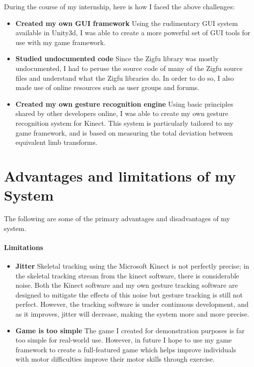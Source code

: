 \documentclass{report}
\begin{document}
During the course of my internship, here is how I faced the above challenges:

\begin{itemize}
	\item \textbf{Created my own GUI framework} Using the rudimentary GUI system available in Unity3d, I was able to create a more powerful set of GUI tools for use with my game framework. 

	\item \textbf{Studied undocumented code} Since the Zigfu library was mostly undocumented, I had to peruse the source code of many of the Zigfu source files and understand what the Zigfu libraries do. In order to do so, I also made use of online resources such as user groups and forums.

	\item \textbf{Created my own gesture recognition engine} Using basic principles shared by other developers online, I was able to create my own gesture recognition system for Kinect. This system is particularly tailored to my game framework, and is based on measuring the total deviation between equivalent limb transforms. 
		
\end{itemize}

\section{Advantages and limitations of my System}

The following are some of the primary advantages and disadvantages of my system.

\paragraph{Limitations}

\begin{itemize}
	\item \textbf{Jitter} Skeletal tracking using the Microsoft Kinect is not perfectly precise; in the skeletal tracking stream from the kinect software, there is considerable noise. Both the Kinect software and my own gesture tracking software are designed to mitigate the effects of this noise but gesture tracking is still not perfect. However, the tracking software is under continuous development, and as it improves, jitter will decrease, making the system more and more precise.

	\item \textbf{Game is too simple} The game I created for demonstration purposes is far too simple for real-world use. However, in future I hope to use my game framework to create a full-featured game which helps improve individuals with motor difficulties improve their motor skills through exercise.
\end{itemize}
\end{document}
